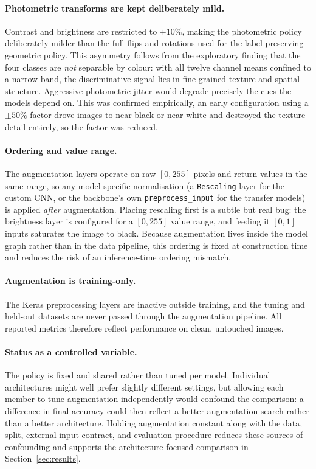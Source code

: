 \documentclass[11pt,twoside,a4paper]{article}
\begin{document}
\paragraph{Photometric transforms are kept deliberately mild.}
Contrast and brightness are restricted to $\pm 10\%$, making the photometric
policy deliberately milder than the full flips and rotations used for the
label-preserving geometric policy. This asymmetry follows from the exploratory
finding that the four classes are \emph{not} separable by
colour: with all twelve channel means confined to a narrow band, the
discriminative signal lies in fine-grained texture and spatial structure.
Aggressive photometric jitter would degrade precisely the cues the models
depend on. This was confirmed empirically, an early configuration using a
$\pm 50\%$ factor drove images to near-black or near-white and destroyed the
texture detail entirely, so the factor was reduced.

\paragraph{Ordering and value range.}
The augmentation layers operate on raw $[0,255]$ pixels and return values in
the same range, so any model-specific normalisation (a \texttt{Rescaling}
layer for the custom CNN, or the backbone's own \texttt{preprocess\_input} for
the transfer models) is applied \emph{after} augmentation. Placing rescaling
first is a subtle but real bug: the brightness layer is configured for a
$[0,255]$ value range, and feeding it $[0,1]$ inputs saturates the image to
black. Because augmentation lives inside the model graph rather than in the
data pipeline, this ordering is fixed at construction time and reduces the risk
of an inference-time ordering mismatch.

\paragraph{Augmentation is training-only.}
The Keras preprocessing layers are inactive outside training, and the tuning
and held-out datasets are never passed through the augmentation pipeline. All
reported metrics therefore reflect performance on clean, untouched images.

\paragraph{Status as a controlled variable.}
The policy is fixed and shared rather than tuned per model. Individual
architectures might well prefer slightly different settings, but allowing each
member to tune augmentation independently would confound the comparison: a
difference in final accuracy could then reflect a better augmentation search
rather than a better architecture. Holding augmentation constant along with
the data, split, external input contract, and evaluation procedure reduces
these sources of confounding and supports the architecture-focused comparison
in Section~\ref{sec:results}.
\end{document}
